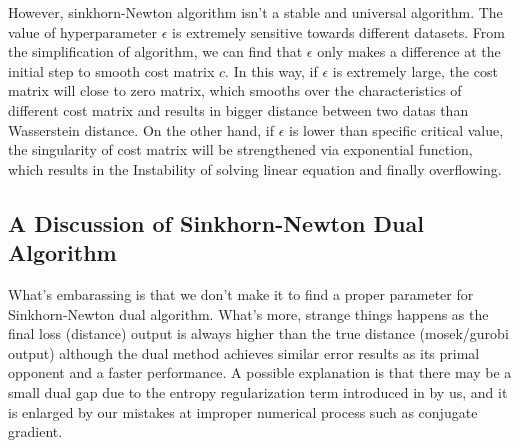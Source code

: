 \documentclass{article}
\begin{document}
\begin{large}
However, sinkhorn-Newton algorithm isn't a stable and universal algorithm. The value of hyperparameter $\epsilon$ is extremely sensitive towards different datasets. From the simplification of algorithm, we can find that $\epsilon$ only makes a difference at the initial step to smooth cost matrix $c$. In this way, if $\epsilon$ is extremely large, the cost matrix will close to zero matrix, which smooths over the characteristics of different cost matrix and results in bigger distance between two datas than Wasserstein distance. On the other hand, if $\epsilon$ is lower than specific critical value, the singularity of cost matrix will be strengthened via exponential function, which results in the Instability of solving linear equation and finally overflowing.

\subsection{A Discussion of Sinkhorn-Newton Dual Algorithm}

What's embarassing is that we don't make it to find a proper parameter for  Sinkhorn-Newton dual algorithm. What's more, strange things happens as the final loss (distance) output is always higher than the true distance (mosek/gurobi output) although the dual method achieves similar error results as its primal opponent and a faster performance. A possible explanation is that there may be a small dual gap due to the entropy regularization term introduced in by us, and it is enlarged by our mistakes at improper numerical process such as conjugate gradient.


\end{large}
\end{document}
